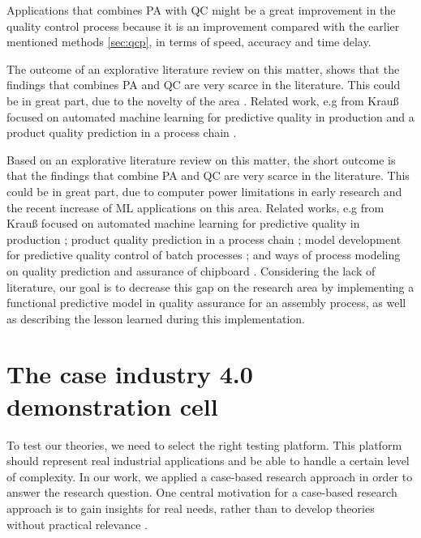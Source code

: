 \documentclass[5p,times,procedia]{elsarticle}
\begin{document}
Applications that combines PA with QC might be a great improvement in the quality control process because it is an improvement compared with the earlier mentioned methods \ref{sec:qcp}, in terms of speed, accuracy and time delay. 

The outcome of an explorative literature review on this matter, shows that the findings that combines PA and QC are very scarce in the literature. This could be in great part, due to the novelty of the area \cite{aumi2012model, ritter1992neue}. Related work, e.g from Krauß focused on automated machine learning for predictive quality in production \cite{krauss2020automated} and a product quality prediction in a process chain \cite{krauss2019machine}. 

Based on an explorative literature review on this matter, the short outcome is that the findings that combine PA and QC are very scarce in the literature. This could be in great part, due to computer power limitations in early research and the recent increase of ML applications on this area. Related works, e.g from Krauß focused on automated machine learning for predictive quality in production \cite{krauss2020automated}; product quality prediction in a process chain \cite{krauss2019machine}; model development for predictive quality control of batch processes \cite{aumi2012model}; and ways of process modeling on quality prediction and assurance of chipboard \cite{ritter1992neue}. Considering the lack of literature, our goal is to decrease this gap on the research area by implementing a functional predictive model in quality assurance for an assembly process, as well as describing the lesson learned during this implementation.
       
\section{The case industry 4.0 demonstration cell} %

To test our theories, we need to select the right testing platform. This platform should represent real industrial applications and be able to handle a certain level of complexity. In our work, we applied a case-based research approach \cite{yin2017case} in order to answer the research question. One central motivation for a case-based research approach is to gain insights for real needs, rather than to develop theories without practical relevance \cite{cutcheon1993case}. %
\end{document}
